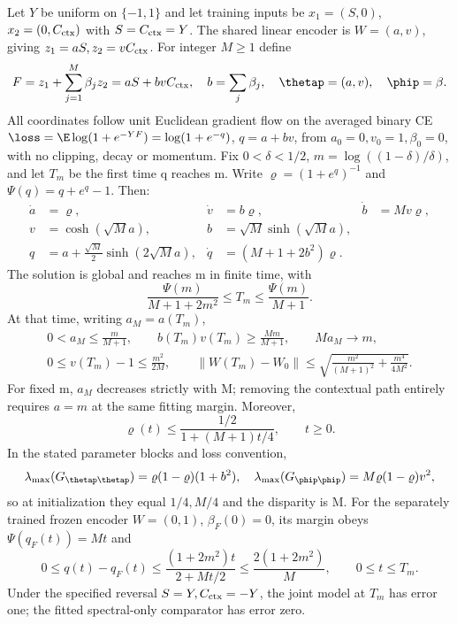 \begin{theorem}
\label{thm:astra_serial}
Let $Y$ be uniform on $\{-1,1\}$ and let training inputs be
$x_1=(S,0)$, $x_2=(0,C_{\rm ctx})$ with $S=C_{\rm ctx}=Y$.
The shared linear encoder is $W=(a,v)$, giving $z_1=aS,z_2=vC_{\rm ctx}$.
For integer $M\ge1$ define
\[
 F=z_1+\sum_{j=1}^M\beta_jz_2=aS+bvC_{\rm ctx},\quad
 b=\sum_j\beta_j,\quad\thetap=(a,v),\quad\phip=\beta.
\]
All coordinates follow unit Euclidean gradient flow on the averaged
binary CE $\loss=\E\log(1+e^{-YF})=\log(1+e^{-q})$, $q=a+bv$,
from $a_0=0,v_0=1,\beta_0=0$, with no clipping, decay or momentum.
Fix $0<\delta<1/2$, $m=\log((1-\delta)/\delta)$, and let $T_m$ be
the first time q reaches m. Write $\varrho=(1+e^q)^{-1}$ and
$\Psi(q)=q+e^q-1$. Then:
\begin{align}
 \dot a&=\varrho,&\dot v&=b\varrho,&\dot b&=Mv\varrho,\label{eq:astra_serial_ode}\\
 v&=\cosh(\sqrt M a),&b&=\sqrt M\sinh(\sqrt M a),\label{eq:astra_serial_phase}\\
 q&=a+\frac{\sqrt M}{2}\sinh(2\sqrt M a),&
 \dot q&=(M+1+2b^2)\varrho.\label{eq:astra_serial_q}
\end{align}
The solution is global and reaches m in finite time, with
\begin{equation}\label{eq:astra_serial_time}
 \frac{\Psi(m)}{M+1+2m^2}\le T_m\le\frac{\Psi(m)}{M+1}.
\end{equation}
At that time, writing $a_M=a(T_m)$,
\begin{gather}
 0<a_M\le\frac{m}{M+1},\qquad b(T_m)v(T_m)\ge\frac{Mm}{M+1},
 \qquad Ma_M\longrightarrow m,\label{eq:astra_serial_update}\\
 0\le v(T_m)-1\le\frac{m^2}{2M},\qquad
 \|W(T_m)-W_0\|\le
 \sqrt{\frac{m^2}{(M+1)^2}+\frac{m^4}{4M^2}}.\label{eq:astra_serial_disp}
\end{gather}
For fixed m, $a_M$ decreases strictly with M; removing the contextual
path entirely requires $a=m$ at the same fitting margin. Moreover,
\begin{equation}\label{eq:astra_serial_envelope}
 \varrho(t)\le\frac{1/2}{1+(M+1)t/4},\qquad t\ge0.
\end{equation}
In the stated parameter blocks and loss convention,
\[
 \lambda_{\max}(G_{\thetap\thetap})=\varrho(1-\varrho)(1+b^2),\quad
 \lambda_{\max}(G_{\phip\phip})=M\varrho(1-\varrho)v^2,
\]
so at initialization they equal $1/4,M/4$ and the disparity is M.
For the separately trained frozen encoder $W=(0,1)$, $\beta_F(0)=0$,
its margin obeys $\Psi(q_F(t))=Mt$ and
\begin{equation}\label{eq:astra_serial_gap}
 0\le q(t)-q_F(t)\le\frac{(1+2m^2)t}{2+Mt/2}
 \le\frac{2(1+2m^2)}M,\qquad0\le t\le T_m.
\end{equation}
Under the specified reversal $S=Y,C_{\rm ctx}=-Y$, the joint model at
$T_m$ has error one; the fitted spectral-only comparator has error zero.
\end{theorem}
